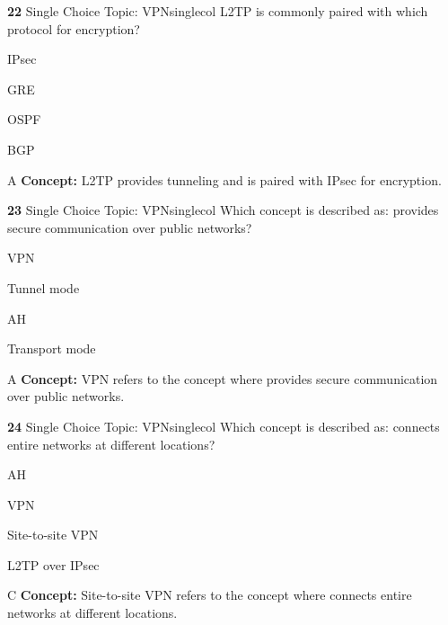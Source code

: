 \documentclass[10pt,a4paper]{article}
\begin{document}
\begin{qcard}{\color{white}\textbf{22} \hfill \small Single Choice \textbar{} Topic: VPN}{singlecol}
L2TP is commonly paired with which protocol for encryption?

\begin{qoptions}
\item IPsec
\item GRE
\item OSPF
\item BGP
\end{qoptions}
\begin{explainbox}{A}
\textbf{Concept:} L2TP provides tunneling and is paired with IPsec for encryption.
\end{explainbox}
\end{qcard}

\begin{qcard}{\color{white}\textbf{23} \hfill \small Single Choice \textbar{} Topic: VPN}{singlecol}
Which concept is described as: provides secure communication over public networks?

\begin{qoptions}
\item VPN
\item Tunnel mode
\item AH
\item Transport mode
\end{qoptions}
\begin{explainbox}{A}
\textbf{Concept:} VPN refers to the concept where provides secure communication over public networks.
\end{explainbox}
\end{qcard}

\begin{qcard}{\color{white}\textbf{24} \hfill \small Single Choice \textbar{} Topic: VPN}{singlecol}
Which concept is described as: connects entire networks at different locations?

\begin{qoptions}
\item AH
\item VPN
\item Site-to-site VPN
\item L2TP over IPsec
\end{qoptions}
\begin{explainbox}{C}
\textbf{Concept:} Site-to-site VPN refers to the concept where connects entire networks at different locations.
\end{explainbox}
\end{qcard}
\end{document}
